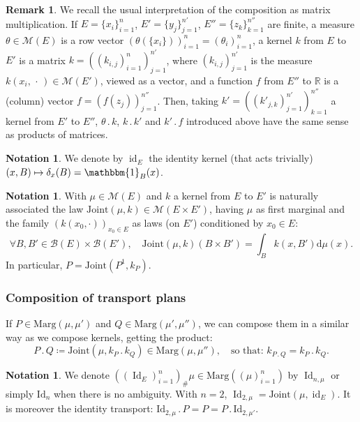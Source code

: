 \documentclass[10pt,a4paper]{article}
\newcommand{\ldot}{\mathbin{.}}
\newcommand\mto{\mathchoice{\longmapsto}{\mapsto}{\mapsto}{\mapsto}}
\theoremstyle{plain}
\theoremstyle{definition}
\newtheorem{notation}[them]{Notation} %
\newtheorem{rem}[them]{Remark}
\newcommand{\dd}{\mathrm{d}}
\newcommand{\id}{\mathrm{Id}}
\newcommand{\join}{\mathrm{Joint}}
\newcommand{\idk}{\operatorname{id}}
\newcommand{\espace}{E}
\newcommand{\Id}{\operatorname{Id}}
\newcommand{\one}{\mathbbm{1}}
\newcommand{\eqdefup}{\coloneqq}
\newcommand{\m}{\mathcal{M}}
\newcommand{\ma}{\mathrm{Marg}}
\newcommand{\R}{\mathbb{R}}
\begin{document}
\begin{rem}\label{rem:matrix}
We recall the usual interpretation of the composition as matrix multiplication. If $E=\{x_i\}_{i=1}^{n}$, $E'=\{y_j\}_{j=1}^{n'}$, $E''=\{z_k\}_{k=1}^{n''}$ are finite, a measure $\theta\in\m(E)$ is a row vector $(\theta(\{x_i\}))_{i=1}^{n}=(\theta_i)_{i=1}^{n}$, a kernel $k$ from $E$ to $E'$ is a matrix $k=((k_{i,j})_{i=1}^{n})_{j=1}^{n'}$, where $(k_{i,j})_{j=1}^{n'}$ is the measure $k(x_i,\,\cdot\,)\in\m(E')$, viewed as a vector, and a function $f$ from $E''$ to $\R$ is a (column) vector $f=(f(z_j))_{j=1}^{n''}$. Then, taking $k'=((k'_{j,k})_{j=1}^{n'})_{k=1}^{n''}$ a kernel from $E'$ to $E''$, $\theta\ldot k$, $k\ldot k'$ and $k'\ldot f$ introduced above have the same sense as products of matrices.
\end{rem}

\begin{notation}\label{not:ident} We denote by $\idk_E$ the identity kernel (that acts trivially) $(x,B)\mto\delta_x(B)=\one_B(x)$.
\end{notation}

\begin{notation}\label{notation_join} With $\mu\in\m(E)$ and $k$ a kernel from $E$ to $E'$ is naturally associated the law $\join(\mu,k)\in\m(\espace\times \espace')$, having $\mu$ as first marginal and the family $(k(x_0,\cdot))_{x_0\in E}$ as laws (on $E'$) conditioned by $x_0\in E$:\vspace*{-3pt}
\[\forall B,B'\in{\mathcal B}(E)\times{\mathcal B}(E'),\quad \join(\mu,k)(B\times B')=\int_Bk(x,B')\dd\mu(x).\]
In particular, $P=\join(P^1,k_P)$.
\end{notation}

\subsubsection{Composition of transport plans}\label{subsubsec:composition} If $P\in\ma(\mu,\mu')$ and $Q\in\ma(\mu',\mu'')$, we can compose them in a similar way as we compose kernels, getting the product:\vspace*{-3pt}
\[P\ldot Q\eqdefup\join(\mu,k_P\ldot k_Q)\in\ma(\mu,\mu''),\quad \text{so that: }k_{P\ldot Q}=k_P\ldot k_Q.\]

\begin{notation}\label{notation:transport_id}
We denote $((\Id_E)_{i=1}^n)_\#\mu\in\ma((\mu)_{i=1}^n)$ by $\Id_{n,\mu}$ or simply $\id_n$ when there is no ambiguity. With $n=2$, $\Id_{2,\mu}=\join(\mu,\idk_E)$. It is moreover the identity transport: $\id_{2,\mu}{}\ldot P=P=P\ldot \id_{2,\mu'}$.
\end{notation}
\end{document}
